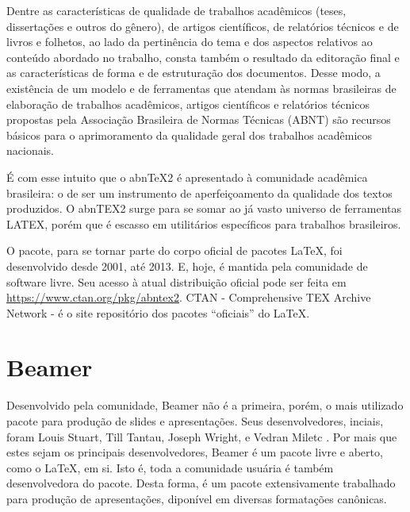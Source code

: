 \documentclass[
	12pt,				%
	openright,			%
	oneside,			%
	a4paper,			%
        brazil,				%
	]{abntex2}
\begin{document}
\begin{citacao}
Dentre as características de qualidade de trabalhos acadêmicos (teses, dissertações e
outros do gênero), de artigos científicos, de relatórios técnicos e de livros e folhetos,
ao lado da pertinência do tema e dos aspectos relativos ao conteúdo abordado no
trabalho, consta também o resultado da editoração final e as características de
forma e de estruturação dos documentos. Desse modo, a existência de um modelo
e de ferramentas que atendam às normas brasileiras de elaboração de trabalhos
acadêmicos, artigos científicos e relatórios técnicos propostas pela Associação
Brasileira de Normas Técnicas (ABNT) são recursos básicos para o aprimoramento
da qualidade geral dos trabalhos acadêmicos nacionais.

É com esse intuito que o abn\TeX2 é apresentado à comunidade acadêmica brasileira:
o de ser um instrumento de aperfeiçoamento da qualidade dos textos produzidos.
O abnTEX2 surge para se somar ao já vasto universo de ferramentas LATEX, porém
que é escasso em utilitários específicos para trabalhos brasileiros. \cite[2.1]{araujoclasse}
\end{citacao}

O pacote, para se tornar parte do corpo oficial de pacotes \LaTeX, foi
desenvolvido desde 2001, até 2013. E, hoje, é mantida pela comunidade
de software livre. Seu acesso à atual distribuição oficial pode ser
feita em \url{https://www.ctan.org/pkg/abntex2}. CTAN - Comprehensive TEX Archive Network - é o site
repositório dos pacotes ``oficiais'' do \LaTeX.

\section{Beamer}

Desenvolvido pela comunidade, Beamer não é a primeira, porém, o mais
utilizado pacote para produção de slides e apresentações. Seus
desenvolvedores, inciais, foram Louis Stuart, Till Tantau, Joseph
Wright, e Vedran Miletc \cite{tantau2010}. Por mais que estes sejam os principais
desenvolvedores, Beamer é um pacote livre e aberto, como o \LaTeX, em
si. Isto é, toda a comunidade usuária é também desenvolvedora do
pacote. Desta forma, é um pacote extensivamente trabalhado para
produção de apresentações, diponível em diversas formatações
canônicas.

\section{}
\end{document}
